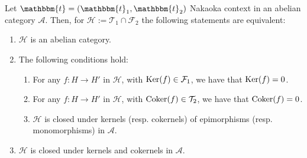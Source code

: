 \begin{thm}\label{thm_2_4}
  Let $\mathbbm{t}=(\mathbbm{t}_1,\mathbbm{t}_2)$ Nakaoka context in an abelian category
  $\mathscr{A}$. Then, for
  $\mathcal{H}:=\mathcal{T}_1\cap\mathcal{F}_2$ the following statements are equivalent:
  \begin{enumerate}[label=(\alph*)]
    \item $\mathcal{H}$ is an abelian category.
    \item The following conditions hold:
      \begin{enumerate}[label=(\alph{enumi}\arabic*)]
        \item For any $f:H\to H'$ in $\mathcal{H}$, with $\operatorname{Ker}(f)\in\mathcal{F}_1$,
        we have that $\operatorname{Ker}(f)=0$.
        \item For any $f:H\to H'$ in $\mathcal{H}$, with $\operatorname{Coker}(f)\in\mathcal{T}_2$,
        we have that $\operatorname{Coker}(f)=0$.
        \item $\mathcal{H}$ is closed under kernels (resp. cokernels) of epimorphisms
        (resp. monomorphisms) in $\mathscr{A}$.
      \end{enumerate}
    \item $\mathcal{H}$ is closed under kernels and cokernels in $\mathscr{A}$.
  \end{enumerate}
\end{thm}

